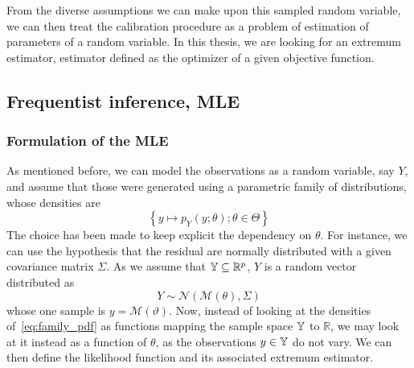 \documentclass[../../Main_ManuscritThese.tex]{subfiles}
\begin{document}
  From the diverse assumptions we can make upon this sampled random variable, we can then treat the calibration procedure as a problem of estimation of parameters of a random variable.
  In this thesis, we are looking for an extremum estimator, estimator defined as the optimizer of a given objective function.
\subsection{Frequentist inference, MLE}
\label{sec:frequentist_inference_MLE}
\subsubsection{Formulation of the MLE}
As mentioned before, we can model the observations as a random variable, say $Y$, and assume that those were generated using a parametric family of distributions, whose densities are
\begin{equation}
  \label{eq:family_pdf}
  \left\{y\mapsto p_{Y}(y; \theta) ; \theta\in\Theta \right\}
\end{equation}
The choice has been made to keep explicit the dependency on $\theta$. For instance, we can use the hypothesis that the residual are normally distributed with a given covariance matrix $\Sigma$. As we assume that $\mathbb{Y} \subseteq \mathbb{R}^p$, $Y$ is a random vector distributed as
\begin{equation}
  \label{eq:lik_gaussian}
  Y  \sim \mathcal{N}(\mathcal{M}(\theta), \Sigma)
\end{equation}
whose one sample is $y=\mathscr{M}(\vartheta)$.
Now, instead of looking at the densities of~\cref{eq:family_pdf} as functions mapping the sample space $\mathbb{Y}$ to $\mathbb{R}$, we may look at it instead as a function of $\theta$, as the observations $y\in\mathbb{Y}$ do not vary. We can then define the likelihood function and its associated extremum estimator.
\end{document}
